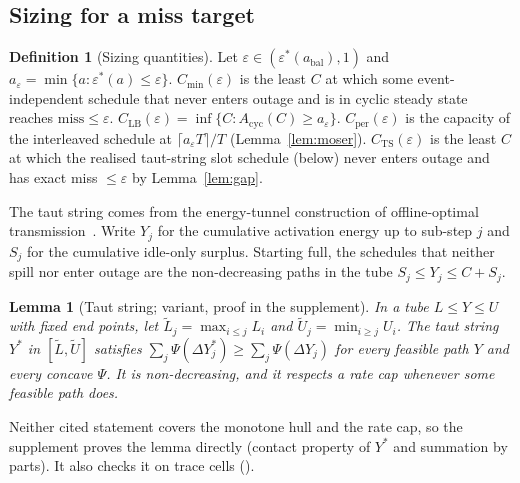 \documentclass[lettersize,journal]{IEEEtran}
\newtheorem{lemma}{Lemma}
\theoremstyle{definition}
\newtheorem{definition}{Definition}
\theoremstyle{remark}
\newcommand{\eps}{\varepsilon}
\newcommand{\Psif}{\Psi}
\begin{document}
\subsection{Sizing for a miss target}\label{sec:sandwich}
\begin{definition}[Sizing quantities]\label{def:sizing}
Let $\eps\in(\eps^*(a_{\mathrm{bal}}),1)$ and $a_\eps=\min\{a:\eps^*(a)\le\eps\}$. $C_{\min}(\eps)$ is the least $C$ at which some event-independent schedule that never enters outage and is in cyclic steady state reaches $\mathrm{miss}\le\eps$. $C_{\mathrm{LB}}(\eps)=\inf\{C:A_{\mathrm{cyc}}(C)\ge a_\eps\}$. $C_{\mathrm{per}}(\eps)$ is the capacity of the interleaved schedule at $\lceil a_\eps T\rceil/T$ (Lemma~\ref{lem:moser}). $C_{\mathrm{TS}}(\eps)$ is the least $C$ at which the realised taut-string slot schedule (below) never enters outage and has exact miss $\le\eps$ by Lemma~\ref{lem:gap}.
\end{definition}
\noindent The taut string comes from the energy-tunnel construction of offline-optimal transmission~\cite{tutuncuoglu2012twc,yang2012tcom}. Write $Y_j$ for the cumulative activation energy up to sub-step $j$ and $S_j$ for the cumulative idle-only surplus. Starting full, the schedules that neither spill nor enter outage are the non-decreasing paths in the tube $S_j\le Y_j\le C+S_j$.
\begin{lemma}[Taut string; variant, proof in the supplement]\label{lem:taut}
In a tube $L\le Y\le U$ with fixed end points, let $\tilde L_j=\max_{i\le j}L_i$ and $\tilde U_j=\min_{i\ge j}U_i$. The taut string $Y^*$ in $[\tilde L,\tilde U]$ satisfies $\sum_j\Psif(\Delta Y^*_j)\ge\sum_j\Psif(\Delta Y_j)$ for every feasible path $Y$ and every concave $\Psif$. It is non-decreasing, and it respects a rate cap whenever some feasible path does.
\end{lemma}
\noindent Neither cited statement covers the monotone hull and the rate cap, so the supplement proves the lemma directly (contact property of $Y^*$ and summation by parts). It also checks it on \LfourN{} trace cells (\LfourOK).
\end{document}
